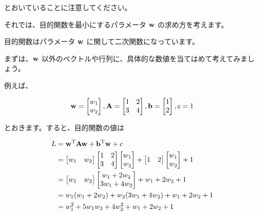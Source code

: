 とおいていることに注意してください。


それでは、目的関数を最小にするパラメータ ${\bf w}$ の求め方を考えます。

目的関数はパラメータ ${\bf w}$ に関して二次関数になっています。

まずは、${\bf w}$ 以外のベクトルや行列に、具体的な数値を当てはめて考えてみましょう。

例えば、


\[
{\bf w} =
\begin{bmatrix}
w_1 \\ w_2
\end{bmatrix},
{\bf A} =
\begin{bmatrix}
1 & 2 \\
3 & 4
\end{bmatrix},
{\bf b} =
\begin{bmatrix}
1 \\
2
\end{bmatrix},
c = 1
\]


とおきます。すると、目的関数の値は


\[
\begin{aligned}
L
&= {\bf w}^{\rm T}{\bf A}{\bf w} +{\bf b}^{\rm T}{\bf w} + c \\
&=
\begin{bmatrix}
w_1 & w_2
\end{bmatrix}
\begin{bmatrix}
1 & 2 \\
3 & 4
\end{bmatrix}
\begin{bmatrix}
w_1 \\
w_2
\end{bmatrix}
+
\begin{bmatrix}
1 & 2
\end{bmatrix}
\begin{bmatrix}
w_1 \\
w_2
\end{bmatrix}
+
1 \\
&=
\begin{bmatrix}
w_1 & w_2
\end{bmatrix}
\begin{bmatrix}
w_1 + 2w_2 \\
3w_1 + 4w_2
\end{bmatrix}
+ w_1 + 2w_2 + 1 \\
&= w_1 (w_1 + 2w_2) + w_2 (3w_1 + 4w_2) + w_1 + 2w_2 + 1 \\
&= w_1^2 + 5 w_1 w_2 + 4 w_2^2 + w_1 + 2 w_2 + 1 \\
\end{aligned}
\]


